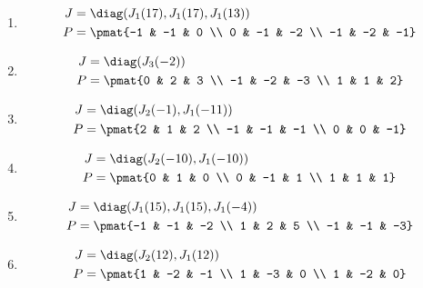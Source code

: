\begin{enumerate}
\item

\begin{align*}
J &= \diag(J_{1}(17), J_{1}(17), J_{1}(13))\\
P &= \pmat{-1 & -1 & 0 \\ 0 & -1 & -2 \\ -1 & -2 & -1}
\end{align*}

\item

\begin{align*}
J &= \diag(J_{3}(-2))\\
P &= \pmat{0 & 2 & 3 \\ -1 & -2 & -3 \\ 1 & 1 & 2}
\end{align*}

\item

\begin{align*}
J &= \diag(J_{2}(-1), J_{1}(-11))\\
P &= \pmat{2 & 1 & 2 \\ -1 & -1 & -1 \\ 0 & 0 & -1}
\end{align*}

\item

\begin{align*}
J &= \diag(J_{2}(-10), J_{1}(-10))\\
P &= \pmat{0 & 1 & 0 \\ 0 & -1 & 1 \\ 1 & 1 & 1}
\end{align*}

\item

\begin{align*}
J &= \diag(J_{1}(15), J_{1}(15), J_{1}(-4))\\
P &= \pmat{-1 & -1 & -2 \\ 1 & 2 & 5 \\ -1 & -1 & -3}
\end{align*}

\item

\begin{align*}
J &= \diag(J_{2}(12), J_{1}(12))\\
P &= \pmat{1 & -2 & -1 \\ 1 & -3 & 0 \\ 1 & -2 & 0}
\end{align*}


\end{enumerate}
